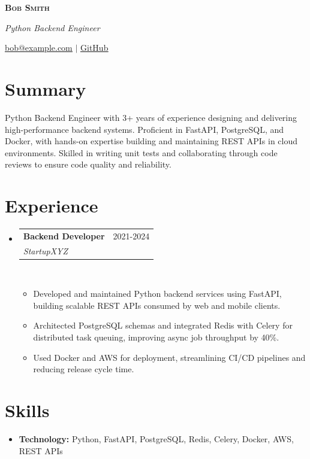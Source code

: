 \documentclass[letterpaper,11pt]{article}
\newcommand{\resumeItem}[1]{\item\small{{#1 \vspace{-3pt}}}}
\newcommand{\resumeSubheading}[4]{
  \vspace{-3pt}\item
    \begin{tabularx}{0.995\textwidth}[t]{Xr}
      \textbf{#1} & #2 \\
      \textit{\small#3} & \textit{\small #4} \\
    \end{tabularx}\\[-3pt]
    \vspace{3pt}
}
\newcommand{\resumeItemListStart}{\begin{itemize}}
\newcommand{\resumeItemListEnd}{\end{itemize}\vspace{-4pt}}
\newcommand{\resumeSubHeadingListStart}{
  \begin{itemize}[leftmargin=0.12in, label={}]
  \setlength{\itemsep}{0pt}
  \setlength{\parsep}{0pt}
  \setlength{\parskip}{0pt}
}
\newcommand{\resumeSubHeadingListEnd}{\end{itemize}}
\begin{document}
\centerline{\textbf{\LARGE \scshape Bob Smith}}
\vspace{1pt}
\centerline{\small\textit{Python Backend Engineer}}
\vspace{1pt}
\centerline{\small \href{mailto:bob@example.com}{\underline{bob@example.com}} $|$ \href{https://github.com/bobsmith}{\underline{GitHub}}}

\section{Summary}
\vspace{-4pt}
\small{Python Backend Engineer with 3+ years of experience designing and delivering high-performance backend systems. Proficient in FastAPI, PostgreSQL, and Docker, with hands-on expertise building and maintaining REST APIs in cloud environments. Skilled in writing unit tests and collaborating through code reviews to ensure code quality and reliability.}
\vspace{2pt}

\section{Experience}
\vspace{-4pt}
\resumeSubHeadingListStart
\resumeSubheading
{Backend Developer}{2021-2024}
{StartupXYZ}{}
\resumeItemListStart
\resumeItem{Developed and maintained Python backend services using FastAPI, building scalable REST APIs consumed by web and mobile clients.}
\resumeItem{Architected PostgreSQL schemas and integrated Redis with Celery for distributed task queuing, improving async job throughput by 40\%.}
\resumeItem{Used Docker and AWS for deployment, streamlining CI/CD pipelines and reducing release cycle time.}
\resumeItemListEnd
\resumeSubHeadingListEnd

\section{Skills}
\vspace{-4pt}
\begin{itemize}[leftmargin=0in, label={}, itemsep=1pt, topsep=2pt, parsep=0pt]
  \item \small{\textbf{Technology:} Python, FastAPI, PostgreSQL, Redis, Celery, Docker, AWS, REST APIs}
\end{itemize}
\end{document}
